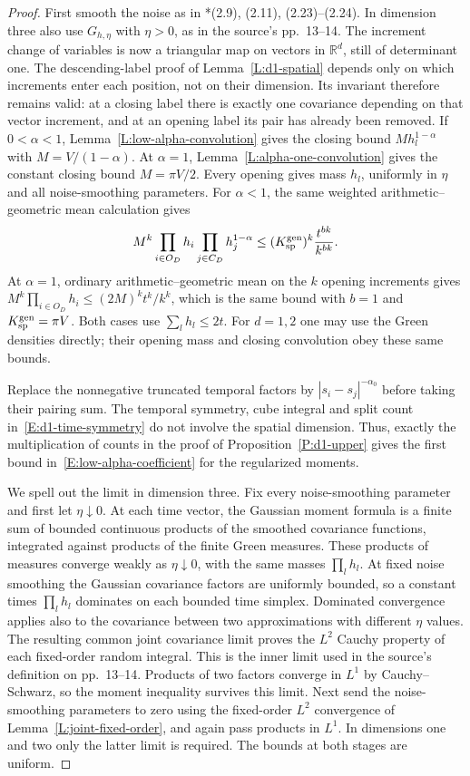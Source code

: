 \documentclass[12pt]{article}
\numberwithin{equation}{section}
\theoremstyle{definition}
\newcommand{\R}{\mathbb{R}}
\begin{document}
\begin{proof}
  First smooth the noise as in
  \cite{chen:author2026:time-dependency}*{(2.9), (2.11), (2.23)--(2.24)}.
  In dimension three also use $G_{h,\eta}$ with $\eta>0$, as in the
  source's pp.~13--14. The increment change of variables is now a
  triangular map on vectors in $\R^d$, still of determinant one.
  The descending-label proof of Lemma~\ref{L:d1-spatial} depends only
  on which increments enter each position, not on their dimension.
  Its invariant therefore remains valid: at a closing label there
  is exactly one covariance depending on that vector increment, and
  at an opening label its pair has already been removed.
  If $0<\alpha<1$, Lemma~\ref{L:low-alpha-convolution} gives the
  closing bound $Mh_l^{1-\alpha}$ with $M=V/(1-\alpha)$.
  At $\alpha=1$, Lemma~\ref{L:alpha-one-convolution} gives the
  constant closing bound $M=\pi V/2$. Every opening gives mass
  $h_l$, uniformly in $\eta$ and all noise-smoothing parameters.
  For $\alpha<1$, the same weighted arithmetic--geometric mean
  calculation gives
  \[
    M^k\prod_{i\in O_D}h_i\prod_{j\in C_D}h_j^{1-\alpha}
    \le (K_{\rm sp}^{\rm gen})^k\frac{t^{bk}}{k^{bk}}.
  \]
  At $\alpha=1$, ordinary arithmetic--geometric mean on the $k$
  opening increments gives
  $M^k\prod_{i\in O_D}h_i\le(2M)^kt^k/k^k$, which is the same
  bound with $b=1$ and $K_{\rm sp}^{\rm gen}=\pi V$.
  Both cases use $\sum_lh_l\le2t$. For $d=1,2$ one may use the
  Green densities directly; their opening mass and closing
  convolution obey these same bounds.

  Replace the nonnegative truncated temporal factors by
  $|s_i-s_j|^{-\alpha_0}$ before taking their pairing sum. The temporal
  symmetry, cube integral and split count
  in~\eqref{E:d1-time-symmetry} do not involve the spatial dimension.
  Thus, exactly the multiplication of counts in the proof of
  Proposition~\ref{P:d1-upper} gives the first bound
  in~\eqref{E:low-alpha-coefficient} for the regularized moments.

  We spell out the limit in dimension three. Fix every noise-smoothing
  parameter and first let $\eta\downarrow0$. At each time vector,
  the Gaussian moment formula is a finite sum of bounded continuous
  products of the smoothed covariance functions, integrated against
  products of the finite Green measures. These products of measures
  converge weakly as $\eta\downarrow0$, with the same masses
  $\prod_l h_l$. At fixed noise smoothing the Gaussian covariance
  factors are uniformly bounded, so a constant times $\prod_lh_l$
  dominates on each bounded time simplex. Dominated convergence
  applies also to the covariance between two approximations with
  different $\eta$ values. The resulting common joint covariance
  limit proves the $L^2$ Cauchy property of each fixed-order random
  integral. This is the inner limit used in the source's definition
  on pp.~13--14. Products of two factors converge in $L^1$ by
  Cauchy--Schwarz, so the moment inequality survives this limit.
  Next send the noise-smoothing parameters to zero using the
  fixed-order $L^2$ convergence of Lemma~\ref{L:joint-fixed-order}, and again
  pass products in $L^1$. In dimensions one and two only the latter
  limit is required. The bounds at both stages are uniform.


\end{proof}
\end{document}
